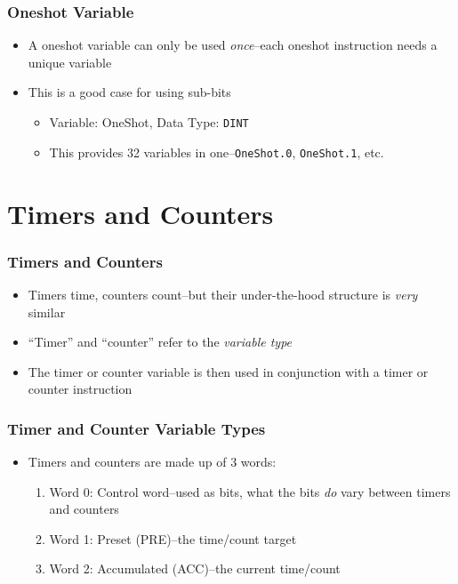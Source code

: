 \begin{frame}
    \frametitle{Oneshot Variable}

    \begin{itemize}
        \item A oneshot variable can only be used \emph{once}--each oneshot instruction needs a unique variable
        \item This is a good case for using sub-bits
        \begin{itemize}
            \item Variable: OneShot, Data Type: \texttt{DINT}
            \item This provides 32 variables in one--\texttt{OneShot.0}, \texttt{OneShot.1}, etc.
        \end{itemize}
    \end{itemize}
\end{frame}

\section{Timers and Counters}

\begin{frame}
    \frametitle{Timers and Counters}

    \begin{itemize}
        \item Timers time, counters count--but their under-the-hood structure is \emph{very} similar
        \item ``Timer'' and ``counter'' refer to the \emph{variable type}
        \item The timer or counter variable is then used in conjunction with a timer or counter instruction
    \end{itemize}
\end{frame}

\begin{frame}
    \frametitle{Timer and Counter Variable Types}

    \begin{itemize}
        \item Timers and counters are made up of 3 words:
        \begin{enumerate}
            \item Word 0: Control word--used as bits, what the bits \emph{do} vary between timers and counters
            \item Word 1: Preset (PRE)--the time/count target
            \item Word 2: Accumulated (ACC)--the current time/count
        \end{enumerate}
    \end{itemize}
\end{frame}

